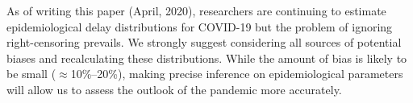 \documentclass[12pt]{article}
\begin{document}
As of writing this paper (April, 2020), researchers are continuing to estimate epidemiological delay distributions for COVID-19 but the problem of ignoring right-censoring prevails.
We strongly suggest considering all sources of potential biases and recalculating these distributions.
While the amount of bias is likely to be small ($\approx$10\%--20\%), making precise inference on epidemiological parameters will allow us to assess the outlook of the pandemic more accurately.


\end{document}
